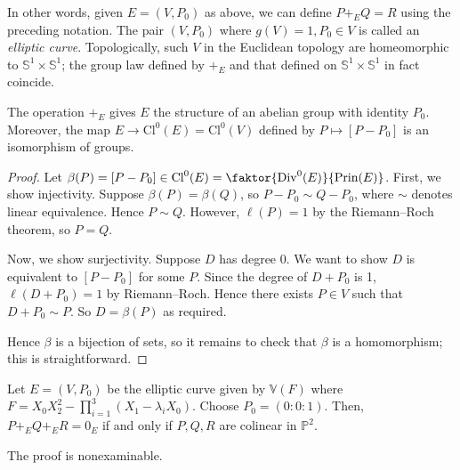 In other words, given \( E = (V, P_0) \) as above, we can define \( P +_E Q = R \) using the preceding notation.
The pair \( (V,P_0) \) where \( g(V) = 1, P_0 \in V \) is called an \emph{elliptic curve}.
Topologically, such \( V \) in the Euclidean topology are homeomorphic to \( \mathbb S^1 \times \mathbb S^1 \); the group law defined by \( +_E \) and that defined on \( \mathbb S^1 \times \mathbb S^1 \) in fact coincide.
\begin{theorem}
    The operation \( +_E \) gives \( E \) the structure of an abelian group with identity \( P_0 \).
    Moreover, the map \( E \to \mathrm{Cl}^0(E) = \mathrm{Cl}^0(V) \) defined by \( P \mapsto [P - P_0] \) is an isomorphism of groups.
\end{theorem}
\begin{proof}
    Let \( \beta(P) = [P - P_0] \in \mathrm{Cl}^0(E) = \faktor{\mathrm{Div}^0(E)}{\mathrm{Prin}(E)} \).
    First, we show injectivity.
    Suppose \( \beta(P) = \beta(Q) \), so \( P - P_0 \sim Q - P_0 \), where \( \sim \) denotes linear equivalence.
    Hence \( P \sim Q \).
    However, \( \ell(P) = 1 \) by the Riemann--Roch theorem, so \( P = Q \).

    Now, we show surjectivity.
    Suppose \( D \) has degree 0.
    We want to show \( D \) is equivalent to \( [P - P_0] \) for some \( P \).
    Since the degree of \( D + P_0 \) is 1, \( \ell(D + P_0) = 1 \) by Riemann--Roch.
    Hence there exists \( P \in V \) such that \( D + P_0 \sim P \).
    So \( D = \beta(P) \) as required.

    Hence \( \beta \) is a bijection of sets, so it remains to check that \( \beta \) is a homomorphism; this is straightforward.
\end{proof}
\begin{theorem}
    Let \( E = (V, P_0) \) be the elliptic curve given by \( \mathbb V(F) \) where \( F = X_0 X_2^2 - \prod_{i=1}^3 (X_1 - \lambda_i X_0) \).
    Choose \( P_0 = (0 : 0 : 1) \).
    Then, \( P +_E Q +_E R = 0_E \) if and only if \( P, Q, R \) are colinear in \( \mathbb P^2 \).
\end{theorem}
The proof is nonexaminable.


